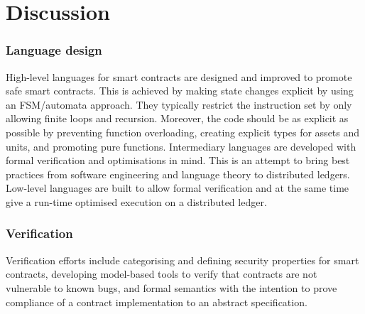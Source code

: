 \section{Discussion}
\label{discuss}

\subsubsection{Language design}
High-level languages for smart contracts are designed and improved to promote safe smart contracts.
This is achieved by making state changes explicit by using an FSM/automata approach. 
They typically restrict the instruction set by only allowing finite loops and recursion.
Moreover, the code should be as explicit as possible by preventing function overloading, creating explicit types for assets and units, and promoting pure functions.
Intermediary languages are developed with formal verification and optimisations in mind.
This is an attempt to bring best practices from software engineering and language theory to distributed ledgers.
Low-level languages are built to allow formal verification and at the same time give a run-time optimised execution on a distributed ledger.

\subsubsection{Verification}
Verification efforts include categorising and defining security properties for smart contracts, developing model-based tools to verify that contracts are not vulnerable to known bugs, and formal semantics with the intention to prove compliance of a contract implementation to an abstract specification.


